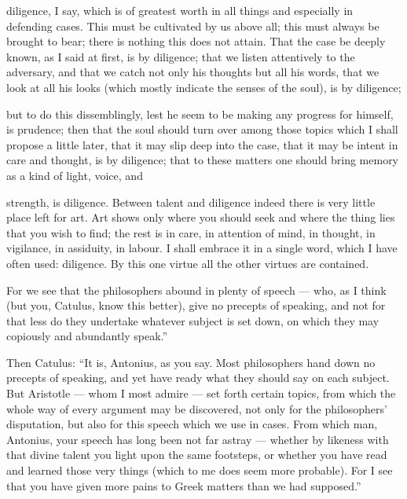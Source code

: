  diligence, I say, which is of greatest worth in all things and especially in defending cases. This must be cultivated by us above all; this must always be brought to bear; there is nothing this does not attain. That the case be deeply known, as I said at first, is by diligence; that we listen attentively to the adversary, and that we catch not only his thoughts but all his words, that we look at all his looks (which mostly indicate the senses of the soul), is by diligence;

 but to do this dissemblingly, lest he seem to be making any progress for himself, is prudence; then that the soul should turn over among those topics which I shall propose a little later, that it may slip deep into the case, that it may be intent in care and thought, is by diligence; that to these matters one should bring memory as a kind of light, voice, and

 strength, is diligence. Between talent and diligence indeed there is very little place left for art. Art shows only where you should seek and where the thing lies that you wish to find; the rest is in care, in attention of mind, in thought, in vigilance, in assiduity, in labour. I shall embrace it in a single word, which I have often used: diligence. By this one virtue all the other virtues are contained.

 For we see that the philosophers abound in plenty of speech — who, as I think (but you, Catulus, know this better), give no precepts of speaking, and not for that less do they undertake whatever subject is set down, on which they may copiously and abundantly speak.''

 Then Catulus: ``It is, Antonius, as you say. Most philosophers hand down no precepts of speaking, and yet have ready what they should say on each subject. But Aristotle — whom I most admire — set forth certain topics, from which the whole way of every argument may be discovered, not only for the philosophers' disputation, but also for this speech which we use in cases. From which man, Antonius, your speech has long been not far astray — whether by likeness with that divine talent you light upon the same footsteps, or whether you have read and learned those very things (which to me does seem more probable). For I see that you have given more pains to Greek matters than we had supposed.''

